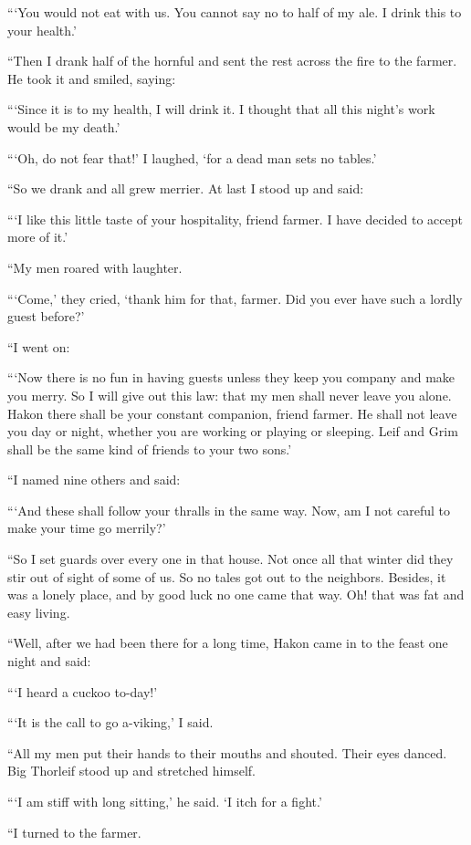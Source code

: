 ```You would not eat with us. You cannot say no to half of my ale. I
drink this to your health.'

``Then I drank half of the hornful and sent the rest across the fire to
the farmer. He took it and smiled, saying:

```Since it is to my health, I will drink it. I thought that all this
night's work would be my death.'

```Oh, do not fear that!' I laughed, `for a dead man sets no tables.'

``So we drank and all grew merrier. At last I stood up and said:

```I like this little taste of your hospitality, friend farmer. I have
decided to accept more of it.'

``My men roared with laughter.

```Come,' they cried, `thank him for that, farmer. Did you ever have such
a lordly guest before?'

``I went on:

```Now there is no fun in having guests unless they keep you company and
make you merry. So I will give out this law: that my men shall never
leave you alone. Hakon there shall be your constant companion, friend
farmer. He shall not leave you day or night, whether you are working or
playing or sleeping. Leif and Grim shall be the same kind of friends to
your two sons.'

``I named nine others and said:

```And these shall follow your thralls in the same way. Now, am I not
careful to make your time go merrily?'

``So I set guards over every one in that house. Not once all that winter
did they stir out of sight of some of us. So no tales got out to the
neighbors. Besides, it was a lonely place, and by good luck no one came
that way. Oh! that was fat and easy living.

``Well, after we had been there for a long time, Hakon came in to the
feast one night and said:

```I heard a cuckoo to-day!'

```It is the call to go a-viking,' I said.

``All my men put their hands to their mouths and shouted. Their eyes
danced. Big Thorleif stood up and stretched himself.

```I am stiff with long sitting,' he said. `I itch for a fight.'

``I turned to the farmer.

